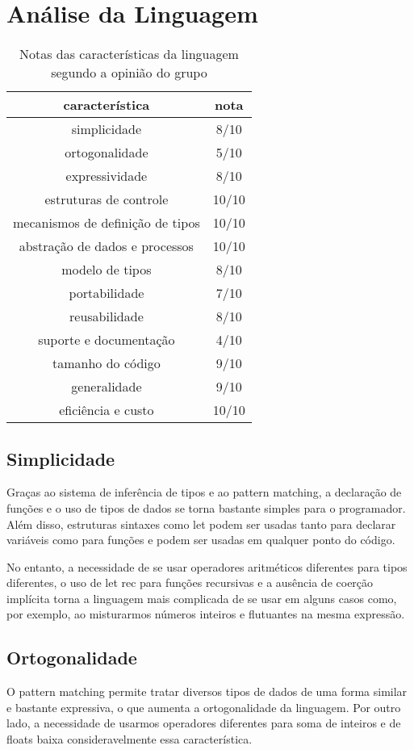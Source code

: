 \documentclass[a4paper,10pt]{article}
\begin{document}
\section{Análise da Linguagem}

\begin{table}[H]
	\centering
 \begin{tabular}{c | c}
  \hline
  característica & nota \\
  \hline
  simplicidade & 8/10\\
  ortogonalidade & 5/10\\
  expressividade & 8/10\\  
  estruturas de controle & 10/10\\
  mecanismos de definição de tipos & 10/10\\
  abstração de dados e processos & 10/10\\
  modelo de tipos & 8/10\\
  portabilidade & 7/10\\
  reusabilidade & 8/10\\
  suporte e documentação & 4/10\\
  tamanho do código & 9/10\\
  generalidade & 9/10\\
  eficiência e custo & 10/10\\
  \hline
 \end{tabular}
	\caption{Notas das características da linguagem segundo a opinião do grupo}
\end{table}

	\subsection{Simplicidade}
		Graças ao sistema de inferência de tipos e ao pattern matching, a declaração de funções e o uso de tipos de dados se torna bastante simples para o programador. Além disso, estruturas sintaxes como let podem ser usadas tanto para declarar variáveis como para funções e podem ser usadas em qualquer ponto do código.
		
		No entanto, a necessidade de se usar operadores aritméticos diferentes para tipos diferentes, o uso de let rec para funções recursivas e a ausência de coerção implícita torna a linguagem mais complicada de se usar em alguns casos como, por exemplo, ao misturarmos números inteiros e flutuantes na mesma expressão.		
		
	\subsection{Ortogonalidade}
		O pattern matching permite tratar diversos tipos de dados de uma forma similar e bastante expressiva, o que aumenta a ortogonalidade da linguagem. Por outro lado, a necessidade de usarmos operadores diferentes para soma de inteiros e de floats baixa consideravelmente essa característica.
		
\end{document}
